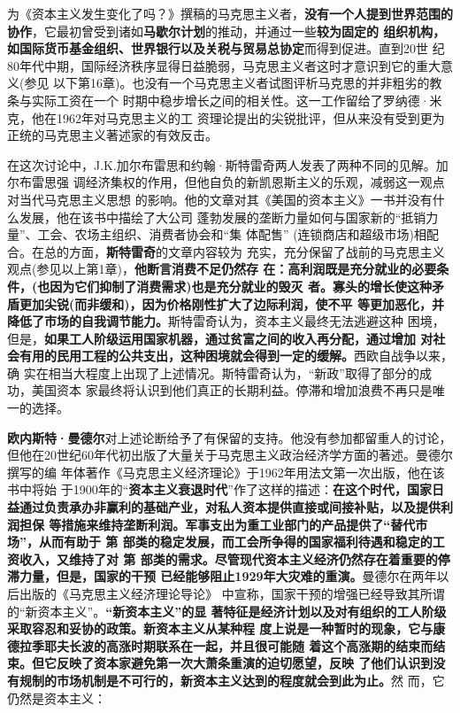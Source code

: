 为《资本主义发生变化了吗？》撰稿的马克思主义者，\textbf{没有一个人提到世界范围的
  协作}，它最初曾受到诸如\textbf{马歇尔计划}的推动，并通过一些\textbf{较为固定的
  组织机构，如国际货币基金组织、世界银行以及关税与贸易总协定}而得到促进。直到20世
纪80年代中期，国际经济秩序显得日益脆弱，马克思主义者这时才意识到它的重大意义(参见
以下第16章)。也没有一个马克思主义者试图评析马克思的并非粗劣的教条与实际工资在一个
时期中稳步增长之间的相关性。这一工作留给了罗纳德·米克，他在1962年对马克思主义的工
资理论提出的尖锐批评，但从来没有受到更为正统的马克思主义著述家的有效反击。

在这次讨论中，J.K.加尔布雷思和约翰·斯特雷奇两人发表了两种不同的见解。加尔布雷思强
调经济集权的作用，但他自负的新凯恩斯主义的乐观，减弱这一观点对当代马克思主义思想
的影响。他的文章对其《美国的资本主义》一书并没有什么发展，他在该书中描绘了大公司
蓬勃发展的垄断力量如何与国家新的“抵销力量”、工会、农场主组织、消费者协会和“集
体配售” (连锁商店和超级市场)相配合。在总的方面，\textbf{斯特雷奇}的文章内容较为
充实，充分保留了战前的马克思主义观点(参见以上第1章)，\textbf{他断言消费不足仍然存
  在：高利润既是充分就业的必要条件，(也因为它们抑制了消费需求)也是充分就业的毁灭
  者。寡头的增长使这种矛盾更加尖锐(而非缓和)，因为价格刚性扩大了边际利润，使不平
  等更加恶化，并降低了市场的自我调节能力。}斯特雷奇认为，资本主义最终无法逃避这种
困境，但是，\textbf{如果工人阶级运用国家机器，通过贫富之间的收入再分配，通过增加
  对社会有用的民用工程的公共支出，这种困境就会得到一定的缓解。}西欧自战争以来，确
实在相当大程度上出现了上述情况。斯特雷奇认为，“新政”取得了部分的成功，美国资本
家最终将认识到他们真正的长期利益。停滞和增加浪费不再只是唯一的选择。

\textbf{欧内斯特·曼德尔}对上述论断给予了有保留的支持。他没有参加都留重人的讨论，
但他在20世纪60年代初出版了大量关于马克思主义政治经济学方面的著述。曼德尔撰写的编
年体著作《马克思主义经济理论》于1962年用法文第一次出版，他在该书中将始
于1900年的“\textbf{资本主义衰退时代}”作了这样的描述：\textbf{在这个时代，国家日
  益通过负责承办非赢利的基础产业，对私人资本提供直接或间接补贴，以及提供利润担保
  等措施来维持垄断利润。军事支出为重工业部门的产品提供了“替代市场”，从而有助于
  第 部类的稳定发展，而工会所争得的国家福利待遇和稳定的工资收入，又维持了对
  第 部类的需求。尽管现代资本主义经济仍然存在着重要的停滞力量，但是，国家的干预
  已经能够阻止1929年大灾难的重演。}曼德尔在两年以后出版的《马克思主义经济理论导论》
中宣称，国家干预的增强已经导致其所谓的“新资本主义”。\textbf{“新资本主义”的显
  著特征是经济计划以及对有组织的工人阶级采取容忍和妥协的政策。新资本主义从某种程
  度上说是一种暂时的现象，它与康德拉季耶夫长波的高涨时期联系在一起，并且很可能随
  着这个高涨期的结束而结束。但它反映了资本家避免第一次大萧条重演的迫切愿望，反映
  了他们认识到没有规制的市场机制是不可行的，新资本主义达到的程度就会到此为止。}然
而，它仍然是资本主义：

